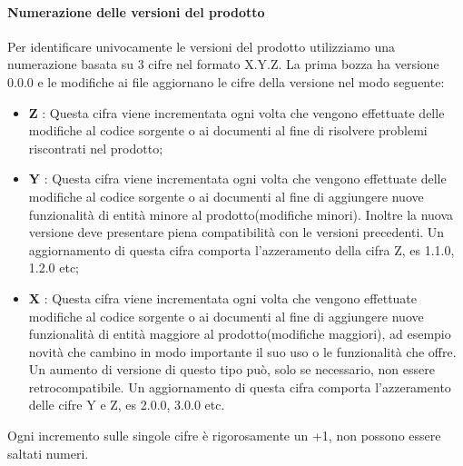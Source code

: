 		\paragraph*{Numerazione delle versioni del prodotto} \mbox{}
		Per identificare univocamente le versioni del prodotto utilizziamo una numerazione basata su 3 cifre nel formato X.Y.Z. La prima bozza ha versione 0.0.0 e le modifiche ai file aggiornano le cifre della versione nel modo seguente:
		\begin{itemize}
			\item \textbf{Z} : Questa cifra viene incrementata ogni volta che vengono effettuate delle modifiche al codice sorgente o ai documenti al fine di risolvere problemi riscontrati nel prodotto\glo;
			\item \textbf{Y} : Questa cifra viene incrementata ogni volta che vengono effettuate delle modifiche al codice sorgente o ai documenti al fine di aggiungere nuove funzionalità di entità minore al prodotto\glo(modifiche minori\glo). Inoltre la nuova versione deve presentare piena compatibilità con le versioni precedenti. Un aggiornamento di questa cifra comporta l'azzeramento della cifra Z, es 1.1.0, 1.2.0 etc;
			\item \textbf{X} : Questa cifra viene incrementata ogni volta che vengono effettuate modifiche al codice sorgente o ai documenti al fine di aggiungere nuove funzionalità di entità maggiore al prodotto\glo(modifiche maggiori\glo), ad esempio novità che cambino in modo importante il suo uso o le funzionalità che offre. Un aumento di versione di questo tipo può, solo se necessario, non essere retrocompatibile. Un aggiornamento di questa cifra comporta l'azzeramento delle cifre Y e Z, es 2.0.0, 3.0.0 etc.
		\end{itemize}
		Ogni incremento sulle singole cifre è rigorosamente un +1, non possono essere saltati numeri.
		

